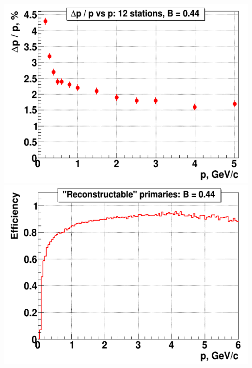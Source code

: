 \documentclass[dvipsnames] {beamer}
\begin{document}
\begin{frame}
\begin{center}
\begin{minipage}{.49\linewidth}
      \end{minipage}
      \begin{minipage}{.49\linewidth}
        \includegraphics[width=.9\linewidth]{momRes_GEM.png} 
        \includegraphics[width=.9\linewidth]{eff_GEM.png}
      \end{minipage}
  \end{center}
       
\end{frame}
\end{document}
